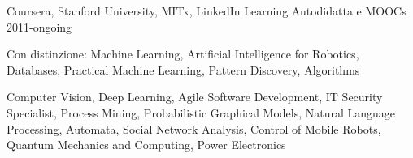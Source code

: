 \begin{cventries}
	\cventry%
		{Coursera, Stanford University, MITx, LinkedIn Learning}
		{Autodidatta e MOOCs}
		{}
		{2011-ongoing}
		{\begin{cvitems}
			\item {Con distinzione: Machine Learning, Artificial Intelligence for Robotics, Databases, Practical Machine Learning, Pattern Discovery, Algorithms}
			\item {Computer Vision, Deep Learning, Agile Software Development, IT Security Specialist, Process Mining, Probabilistic Graphical Models, Natural Language Processing, Automata, Social Network Analysis, Control of Mobile Robots, Quantum Mechanics and Computing, Power Electronics}
		\end{cvitems}}
\end{cventries}
